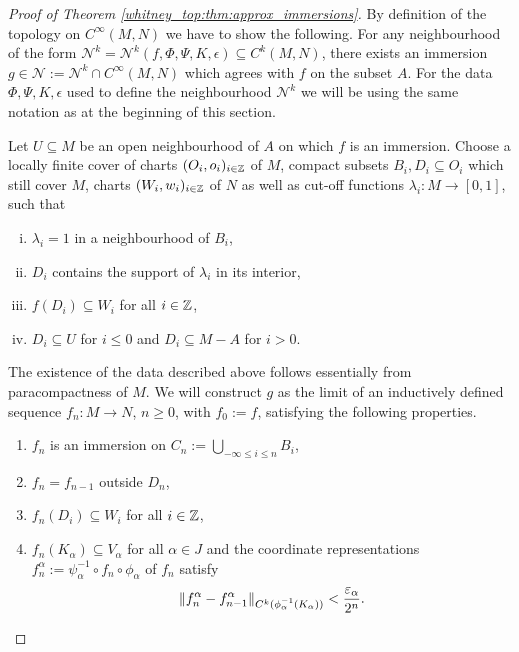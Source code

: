 \begin{proof}[Proof of Theorem \ref{whitney_top:thm:approx_immersions}]
    By definition of the topology on $C^\infty(M,N)$ we have to show the following. For any neighbourhood of the form $\mathcal{N}^k = \mathcal{N}^k(f,\Phi,\Psi,K,\epsilon) \subseteq C^k(M,N)$, there exists an immersion $g \in \mathcal{N} := \mathcal{N}^k \cap C^\infty(M,N)$ which agrees with $f$ on the subset $A$. For the data $\Phi, \Psi, K, \epsilon$ used to define the neighbourhood $\mathcal{N}^k$ we will be using the same notation as at the beginning of this section.
    
    Let $U \subseteq M$ be an open neighbourhood of $A$ on which $f$ is an immersion. Choose a locally finite cover of charts $(O_i,o_i)_{i\in \mathbb{Z}}$ of $M$, compact subsets $B_i, D_i \subseteq O_i$ which still cover $M$, charts $(W_i,w_i)_{i\in \mathbb{Z}}$ of $N$ as well as cut-off functions $\lambda_i \colon M \to [0,1]$, such that 
    \begin{enumerate}[(i)]
        \item \label{whitney_top:eq:immersion_cover_property1}$\lambda_i = 1$ in a neighbourhood of $B_i$,
        \item \label{whitney_top:eq:immersion_cover_property2}$D_i$ contains the support of $\lambda_i$ in its interior,
        \item $f(D_i) \subseteq W_i$ for all $i \in \mathbb{Z}$,
        \item \label{whitney_top:eq:immersion_cover_property4}$D_i \subseteq U$ for $i \leq 0$ and $D_i \subseteq M - A$ for $i >0$.
    \end{enumerate}
    The existence of the data described above follows essentially from paracompactness of $M$. We will construct $g$ as the limit of an inductively defined sequence $f_n \colon M \to N$, $n \geq 0$, with $f_0 := f$, satisfying the following properties.

    \begin{enumerate}[1)]
        \item \label{whitney_top:eq:immersion_property_1} $f_n$ is an immersion on $C_n := \bigcup_{-\infty \leq i \leq n} B_i$,
        \item \label{whitney_top:eq:immersion_property_2} $f_n = f_{n-1}$ outside $D_n$,
        \item \label{whitney_top:eq:immersion_property_3} $f_n(D_i) \subseteq W_i$ for all $i \in \mathbb{Z}$,
        \item \label{whitney_top:eq:immersion_property_4} $f_n(K_\alpha) \subseteq V_\alpha$ for all $\alpha \in J$ and the coordinate representations $f_n^\alpha := \psi^{-1}_\alpha \circ f_n \circ \phi_\alpha$ of $f_n$ satisfy 
        \[
        \lVert f_n^\alpha - f_{n-1}^\alpha\rVert_{C^k(\phi_\alpha^{-1}(K_\alpha))} < \frac{\varepsilon_\alpha}{2^n}.
        \]
    \end{enumerate}


\end{proof}
